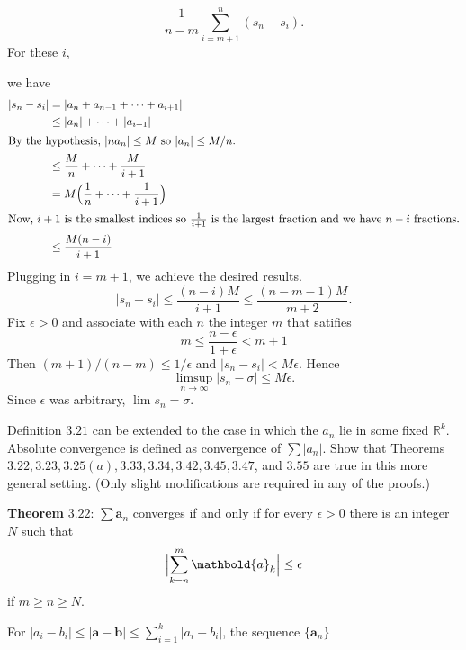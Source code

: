 \begin{exercise}
\begin{exercise}[label = (\alph*), ref = \arabic{exercisei} (\alph*)]
\[    \frac{1}{n - m}\sum_{i = m + 1}^n(s_n - s_i).
    \]
    For these \(i\),
    \par\smallskip
    {\color{NavyBlue}
      we have
      \begin{align*}
        \lvert s_n - s_i\rvert
        & = \lvert a_n + a_{n - 1} + \cdots + a_{i + 1}\rvert\\
        & \leq \lvert a_n\rvert + \cdots + \lvert a_{i + 1}\rvert\\
        \intertext{By the hypothesis, \(\lvert na_n\rvert\leq M\) so
        \(\lvert a_n\rvert\leq M/n\).}
        & \leq \frac{M}{n} + \cdots + \frac{M}{i + 1}\\
        & = M\Bigl(\frac{1}{n} + \cdots + \frac{1}{i + 1}\Bigr)\\
        \intertext{Now, \(i + 1\) is the smallest indices so
        \(\frac{1}{i + 1}\) is the largest fraction and we have \(n - i\)
        fractions.}
        & \leq \frac{M(n - i)}{i + 1}
      \end{align*}
      Plugging in \(i = m + 1\), we achieve the desired results.
    }
    \[
    \lvert s_n - s_i\rvert\leq\frac{(n - i)M}{i + 1}\leq
    \frac{(n - m - 1)M}{m + 2}.
    \]
    Fix \(\epsilon > 0\) and associate with each \(n\) the integer \(m\) that
    satifies
    \[
    m\leq\frac{n - \epsilon}{1 + \epsilon} < m + 1
    \]
    Then \((m + 1)/(n - m)\leq 1/\epsilon\) and
    \(\lvert s_n - s_i\rvert < M\epsilon\).
    Hence
    \[
    \limsup_{n\to\infty}\lvert s_n - \sigma\rvert\leq M\epsilon.
    \]
    Since \(\epsilon\) was arbitrary, \(\lim s_n = \sigma\).
  \end{exercise}
\item
  Definition \(3.21\) can be extended to the case in which the \(a_n\) lie in
  some fixed \(\mathbb{R}^k\).
  Absolute convergence is defined as convergence of \(\sum\lvert a_n\rvert\).
  Show that Theorems \(3.22,3.23,3.25(a),3.33,3.34,3.42,3.45,3.47\), and
  \(3.55\) are true in this more general setting.
  (Only slight modifications are required in any of the proofs.)
  \par\smallskip
  \textbf{Theorem} \(\mathbold{3.22}\): \(\sum\mathbold{a}_n\) converges if
  and only if for every \(\epsilon > 0\) there is an integer \(N\) such that
  \[
  \Bigl\lvert\sum_{k = n}^m\mathbold{a}_k\Bigr\rvert\leq\epsilon
  \]
  if \(m\geq n\geq N\).
  \par\smallskip
  For \(\lvert a_i - b_i\rvert\leq\lvert\mathbold{a} - \mathbold{b}\rvert\leq
  \sum_{i = 1}^k\lvert a_i - b_i\rvert\), the sequence \(\{\mathbold{a}_n\}\)

\end{exercise}
